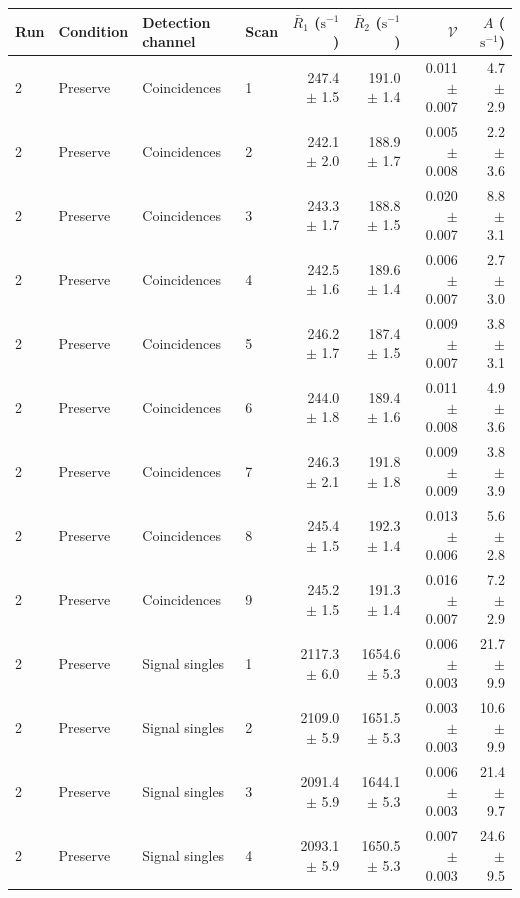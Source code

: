 \begin{tabular}{llllrrrr}
\toprule
Run & Condition & Detection channel & Scan & $\bar R_1$ ($\mathrm{s}^{-1}$) & $\bar R_2$ ($\mathrm{s}^{-1}$) & $\mathcal{V}$ & $A$ ($\mathrm{s}^{-1}$) \\
\midrule
2 & Preserve & Coincidences & 1 & 247.4 \ensuremath{\pm} 1.5 & 191.0 \ensuremath{\pm} 1.4 & 0.011 \ensuremath{\pm} 0.007 & 4.7 \ensuremath{\pm} 2.9 \\
2 & Preserve & Coincidences & 2 & 242.1 \ensuremath{\pm} 2.0 & 188.9 \ensuremath{\pm} 1.7 & 0.005 \ensuremath{\pm} 0.008 & 2.2 \ensuremath{\pm} 3.6 \\
2 & Preserve & Coincidences & 3 & 243.3 \ensuremath{\pm} 1.7 & 188.8 \ensuremath{\pm} 1.5 & 0.020 \ensuremath{\pm} 0.007 & 8.8 \ensuremath{\pm} 3.1 \\
2 & Preserve & Coincidences & 4 & 242.5 \ensuremath{\pm} 1.6 & 189.6 \ensuremath{\pm} 1.4 & 0.006 \ensuremath{\pm} 0.007 & 2.7 \ensuremath{\pm} 3.0 \\
2 & Preserve & Coincidences & 5 & 246.2 \ensuremath{\pm} 1.7 & 187.4 \ensuremath{\pm} 1.5 & 0.009 \ensuremath{\pm} 0.007 & 3.8 \ensuremath{\pm} 3.1 \\
2 & Preserve & Coincidences & 6 & 244.0 \ensuremath{\pm} 1.8 & 189.4 \ensuremath{\pm} 1.6 & 0.011 \ensuremath{\pm} 0.008 & 4.9 \ensuremath{\pm} 3.6 \\
2 & Preserve & Coincidences & 7 & 246.3 \ensuremath{\pm} 2.1 & 191.8 \ensuremath{\pm} 1.8 & 0.009 \ensuremath{\pm} 0.009 & 3.8 \ensuremath{\pm} 3.9 \\
2 & Preserve & Coincidences & 8 & 245.4 \ensuremath{\pm} 1.5 & 192.3 \ensuremath{\pm} 1.4 & 0.013 \ensuremath{\pm} 0.006 & 5.6 \ensuremath{\pm} 2.8 \\
2 & Preserve & Coincidences & 9 & 245.2 \ensuremath{\pm} 1.5 & 191.3 \ensuremath{\pm} 1.4 & 0.016 \ensuremath{\pm} 0.007 & 7.2 \ensuremath{\pm} 2.9 \\
\midrule
2 & Preserve & Signal singles & 1 & 2117.3 \ensuremath{\pm} 6.0 & 1654.6 \ensuremath{\pm} 5.3 & 0.006 \ensuremath{\pm} 0.003 & 21.7 \ensuremath{\pm} 9.9 \\
2 & Preserve & Signal singles & 2 & 2109.0 \ensuremath{\pm} 5.9 & 1651.5 \ensuremath{\pm} 5.3 & 0.003 \ensuremath{\pm} 0.003 & 10.6 \ensuremath{\pm} 9.9 \\
2 & Preserve & Signal singles & 3 & 2091.4 \ensuremath{\pm} 5.9 & 1644.1 \ensuremath{\pm} 5.3 & 0.006 \ensuremath{\pm} 0.003 & 21.4 \ensuremath{\pm} 9.7 \\
2 & Preserve & Signal singles & 4 & 2093.1 \ensuremath{\pm} 5.9 & 1650.5 \ensuremath{\pm} 5.3 & 0.007 \ensuremath{\pm} 0.003 & 24.6 \ensuremath{\pm} 9.5 \\

\end{tabular}

